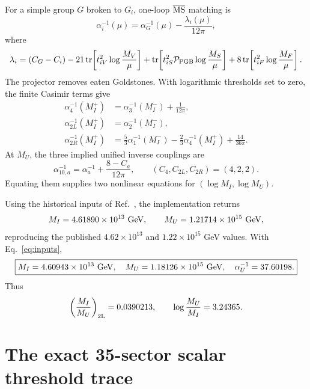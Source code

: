 \documentclass[11pt]{article}
\newcommand{\tr}{\operatorname{tr}}
\newcommand{\cP}{\mathcal P}
\begin{document}
For a simple group $G$ broken to $G_i$, one-loop $\overline{\rm MS}$ matching
is~\cite{BabuKhan2015}
\begin{equation}
 \alpha_i^{-1}(\mu)=\alpha_G^{-1}(\mu)-\frac{\lambda_i(\mu)}{12\pi},
 \label{eq:matching}
\end{equation}
where
\begin{equation}
 \lambda_i=(C_G-C_i)
 -21\tr\!\left[t_{iV}^2\log\frac{M_V}{\mu}\right]
 +\tr\!\left[t_{iS}^2\cP_{\rm PGB}\log\frac{M_S}{\mu}\right]
 +8\tr\!\left[t_{iF}^2\log\frac{M_F}{\mu}\right].
 \label{eq:lambda}
\end{equation}
The projector removes eaten Goldstones.  With logarithmic thresholds set to
zero, the finite Casimir terms give
\begin{align}
 \alpha_4^{-1}(M_I^+)&=\alpha_3^{-1}(M_I^-)+\frac1{12\pi},\nonumber\\
 \alpha_{2L}^{-1}(M_I^+)&=\alpha_2^{-1}(M_I^-),\nonumber\\
 \alpha_{2R}^{-1}(M_I^+)&=\frac53\alpha_1^{-1}(M_I^-)
 -\frac23\alpha_4^{-1}(M_I^+)+\frac{14}{36\pi}.
 \label{eq:matchingMI}
\end{align}
At $M_U$, the three implied unified inverse couplings are
\begin{equation}
 \alpha_{10,a}^{-1}=\alpha_a^{-1}
 +\frac{8-C_a}{12\pi},\qquad (C_4,C_{2L},C_{2R})=(4,2,2).
 \label{eq:matchingMU}
\end{equation}
Equating them supplies two nonlinear equations for
$(\log M_I,\log M_U)$.

Using the historical inputs of Ref.~\cite{BabuKhan2015}, the implementation
returns
\begin{equation}
 M_I=4.61890\times10^{13}\ {\rm GeV},\qquad
 M_U=1.21714\times10^{15}\ {\rm GeV},
 \label{eq:validation}
\end{equation}
reproducing the published $4.62\times10^{13}$ and
$1.22\times10^{15}$ GeV values.  With Eq.~\eqref{eq:inputs},
\begin{equation}
 \boxed{
 M_I=4.60943\times10^{13}\ {\rm GeV},\quad
 M_U=1.18126\times10^{15}\ {\rm GeV},\quad
 \alpha_U^{-1}=37.60198.}
 \label{eq:baseline}
\end{equation}
Thus
\begin{equation}
 \left(\frac{M_I}{M_U}\right)_{\rm 2L}=0.0390213,\qquad
 \log\frac{M_U}{M_I}=3.24365.
 \label{eq:requiredinterval}
\end{equation}

\section{The exact 35-sector scalar threshold trace}
\end{document}
